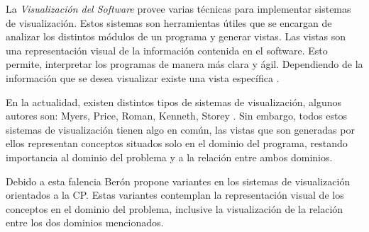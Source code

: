 \documentclass[a4paper,12pt]{report}
\begin{document}
La \textit{Visualización del Software} provee varias técnicas para implementar sistemas de visualización. Estos sistemas son herramientas útiles que se encargan de analizar los distintos módulos de un programa y generar vistas. Las vistas son una representación visual de la información contenida en el software. Esto permite, interpretar los programas de manera más clara y ágil. Dependiendo de la información que se desea visualizar existe una vista específica \cite{MPMR07}.%






 

En la actualidad, existen distintos tipos de sistemas de visualización, algunos autores son: Myers, Price, Roman, Kenneth, Storey \cite{MBPHRU10}. Sin embargo, todos estos sistemas de visualización tienen algo en común, las vistas que son generadas por ellos representan conceptos situados solo en el dominio del programa, restando importancia al dominio del problema y a la relación entre ambos dominios.

Debido a esta falencia Berón \cite{MBPHRU10} propone variantes en los sistemas de visualización orientados a la CP. Estas variantes contemplan la representación visual de los conceptos en el dominio del problema, inclusive la visualización de la relación entre los dos dominios mencionados.
\end{document}
